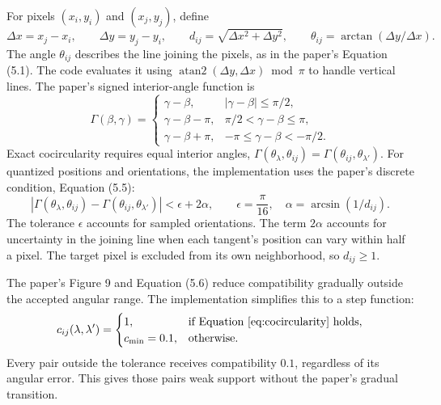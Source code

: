 \documentclass[10pt,letterpaper]{article}
\begin{document}
For pixels $(x_i,y_i)$ and $(x_j,y_j)$, define
\begin{equation}
\Delta x=x_j-x_i,\qquad \Delta y=y_j-y_i,\qquad
d_{ij}=\sqrt{\Delta x^2+\Delta y^2},\qquad
\theta_{ij}=\arctan(\Delta y/\Delta x).
\end{equation}
The angle $\theta_{ij}$ describes the line joining the pixels, as in
the paper's Equation (5.1). The code evaluates it using
$\operatorname{atan2}(\Delta y,\Delta x)\bmod\pi$ to handle vertical lines.
The paper's signed interior-angle function is
\begin{equation}
\Gamma(\beta,\gamma)=
\begin{cases}
\gamma-\beta, & |\gamma-\beta|\leq\pi/2,\\
\gamma-\beta-\pi, & \pi/2<\gamma-\beta\leq\pi,\\
\gamma-\beta+\pi, & -\pi\leq\gamma-\beta<-\pi/2.
\end{cases}
\end{equation}
Exact cocircularity requires equal interior angles,
$\Gamma(\theta_\lambda,\theta_{ij})=
\Gamma(\theta_{ij},\theta_{\lambda'})$.
For quantized positions and orientations, the implementation uses the paper's
discrete condition, Equation (5.5):
\begin{equation}
\left|\Gamma(\theta_\lambda,\theta_{ij})-
\Gamma(\theta_{ij},\theta_{\lambda'})\right|
<\epsilon+2\alpha,\qquad
\epsilon=\frac{\pi}{16},\quad \alpha=\arcsin(1/d_{ij}).
\label{eq:cocircularity}
\end{equation}
The tolerance $\epsilon$ accounts for sampled orientations. The term
$2\alpha$ accounts for uncertainty in the joining line when each tangent's
position can vary within half a pixel. The target pixel is excluded from its
own neighborhood, so $d_{ij}\geq1$.

The paper's Figure 9 and Equation (5.6) reduce compatibility gradually
outside the accepted angular range. The implementation simplifies this to
a step function:
\begin{equation}
c_{ij}(\lambda,\lambda')=
\begin{cases}
1, & \text{if Equation~\eqref{eq:cocircularity} holds},\\
c_{\min}=0.1, & \text{otherwise}.
\end{cases}
\end{equation}
Every pair outside the tolerance receives compatibility $0.1$, regardless
of its angular error. This gives those pairs weak support without the
paper's gradual transition.
\end{document}
